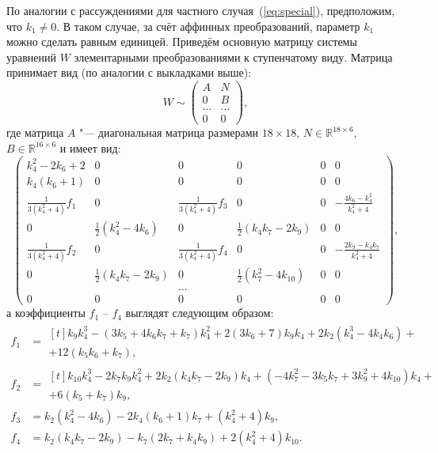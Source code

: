\documentclass[../main.tex]{subfiles}
\begin{document}
По аналогии с рассуждениями для частного случая~(\ref{eq:special}), предположим, что $k_1 \ne 0 $. В таком случае, за счёт аффинных преобразований, параметр $k_1$ можно сделать равным единицей. Приведём основную матрицу системы уравнений $W$ элементарными преобразованиями к ступенчатому виду. Матрица принимает вид (по аналогии с выкладками выше): 
\begin{equation*}
W \sim
\begin{pmatrix}
A & N \\
0 & B \\
\hdots & \hdots  \\
0 & 0
\end{pmatrix},
\end{equation*}
где матрица $A$ "--- диагональная матрица размерами $18\times18$, $N\in \mathbb{R}^{18\times6}$, $B \in \mathbb{R}^{16\times6}$ и имеет вид:
\begin{equation}\label{eq:matrix_general}
{\left(
\begin{array}{cccccc}
 k_4^2-2 k_6+2 & 0 & 0 & 0 & 0 & 0 \\
 k_4 \left(k_6+1\right) & 0 & 0 & 0 & 0 & 0 \\
 \frac{1}{3\left(k_4^2+4\right)}f_1 & 0 & \frac{1}{3 \left(k_4^2+4\right)}f_3 & 0 & 0 & -\frac{4
   k_6-k_4^2}{k_4^2+4} \\
 0 & \frac{1}{2} \left(k_4^2-4 k_6\right) & 0 & \frac{1}{2} \left(k_4 k_7-2 k_9\right) & 0 & 0 \\
 \frac{1}{3\left(k_4^2+4\right)}f_2 & 0 & \frac{1}{3 \left(k_4^2+4\right)}f_4 & 0 & 0 & -\frac{2k_9-k_4 k_7}{k_4^2+4} \\
 0 & \frac{1}{2} \left(k_4 k_7-2 k_9\right) & 0 & \frac{1}{2} \left(k_7^2-4 k_{10}\right) & 0 & 0 \\
  &  & \hdots &  &  & \\
 0 & 0 & 0 & 0 & 0 & 0
\end{array}
\right)},
\end{equation}
а коэффициенты $f_1$ -- $f_4$ выглядят следующим образом:
\begin{align*}
f_1 &=
\begin{multlined}[t]
k_9 k_4^3-\left(3 k_5+4 k_6 k_7+k_7\right) k_4^2+2 \left(3 k_6+7\right) k_9 k_4+2 k_2 \left(k_4^3-4 k_4 k_6\right) + \\ 
+ 12 \left(k_5 k_6+k_7\right),
\end{multlined}\\
f_2 &= 
\begin{multlined}[t]
k_{10} k_4^3-2 k_7 k_9 k_4^2+2 k_2 \left(k_4 k_7-2 k_9\right) k_4+\left(-4 k_7^2-3 k_5 k_7+3 k_9^2+4 k_{10}\right) k_4+ \\
+ 6 \left(k_5+k_7\right) k_9,
\end{multlined}\\
f_3 &= k_2 \left(k_4^2-4 k_6\right)-2 k_4 \left(k_6+1\right) k_7+\left(k_4^2+4\right) k_9, \\ 
f_4 &= k_2 \left(k_4 k_7-2 k_9\right)-k_7 \left(2 k_7+k_4 k_9\right)+2 \left(k_4^2+4\right) k_{10}.
\end{align*}
\end{document}
